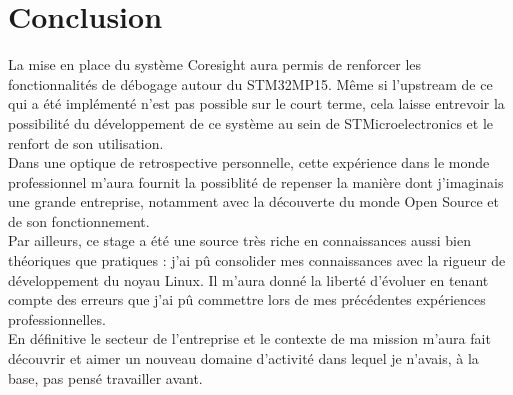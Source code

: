 
\chapter*{Conclusion}
\label{chp:conclusion}

La mise en place du système Coresight aura permis de renforcer les
fonctionnalités de débogage autour du STM32MP15. Même si l'upstream de ce qui
a été implémenté n'est pas possible sur le court terme, cela laisse entrevoir
la possibilité du développement de ce système au sein de STMicroelectronics et
le renfort de son utilisation. \\

Dans une optique de retrospective personnelle, cette expérience dans le monde
professionnel m'aura fournit la possiblité de repenser la manière dont
j'imaginais une grande entreprise, notamment avec la découverte du monde Open
Source et de son fonctionnement. \\

Par ailleurs, ce stage a été une source très riche en connaissances aussi bien
théoriques que pratiques : j'ai pû consolider mes connaissances  avec la
rigueur de développement du noyau Linux. Il m'aura donné la liberté d'évoluer
en tenant compte des erreurs que j'ai pû commettre lors de mes précédentes
expériences professionnelles. \\

En définitive le secteur de l'entreprise et le contexte de ma mission m'aura
fait découvrir et aimer un nouveau domaine d'activité dans lequel je n'avais,
à la base, pas pensé travailler avant.
